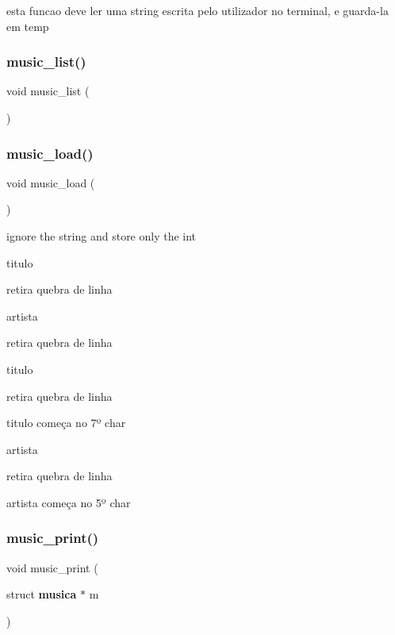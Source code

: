 esta funcao deve ler uma string escrita pelo utilizador no terminal, e guarda-\/la em temp \mbox{\label{menu__music_8c_a805fc5a774bc1872a74344155c721bd4}} 
\subsubsection{music\_list()}
{\footnotesize\ttfamily void music\+\_\+list (\begin{DoxyParamCaption}{ }\end{DoxyParamCaption})}

\mbox{\label{menu__music_8c_a35fb249f740a3763e67875658fb507ec}} 
\subsubsection{music\_load()}
{\footnotesize\ttfamily void music\+\_\+load (\begin{DoxyParamCaption}{ }\end{DoxyParamCaption})}

ignore the string and store only the int

titulo

retira quebra de linha

artista

retira quebra de linha

titulo

retira quebra de linha

titulo começa no 7º char

artista

retira quebra de linha

artista começa no 5º char \mbox{\label{menu__music_8c_a0593b129f68797b24a9ddbec810a80e9}} 
\subsubsection{music\_print()}
{\footnotesize\ttfamily void music\+\_\+print (\begin{DoxyParamCaption}\item[{struct \textbf{ musica} $\ast$}]{m }\end{DoxyParamCaption})}


